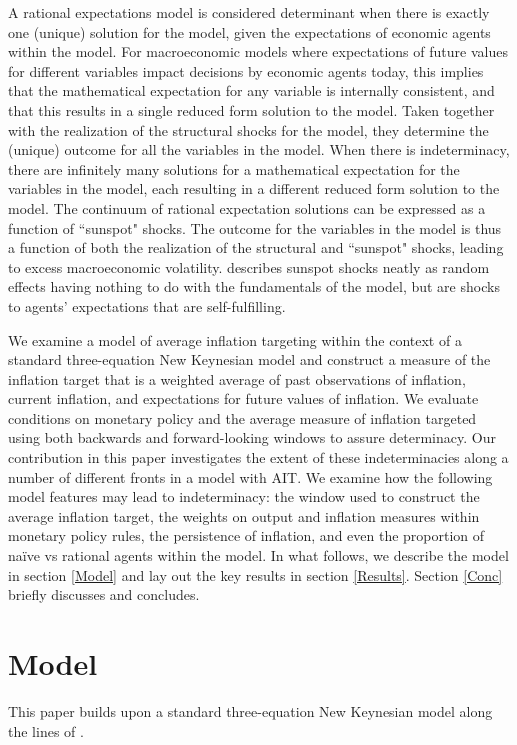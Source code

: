 \documentclass[english,authoryear,12pt]{elsarticle}
\begin{document}
A rational expectations model is considered determinant when there is exactly one (unique) solution for the model, given the expectations of economic agents within the model. For macroeconomic models where expectations of future values for different variables impact decisions by economic agents today, this implies that the mathematical expectation for any variable is internally consistent, and that this results in a single reduced form solution to the model. Taken together with the realization of the structural shocks for the model, they determine the (unique) outcome for all the variables in the model. When there is indeterminacy, there are infinitely many solutions for a mathematical expectation for the variables in the model, each resulting in a different reduced form solution to the model. The continuum of rational expectation solutions can be expressed as a function of ``sunspot" shocks. The outcome for the variables in the model is thus a function of both the realization of the structural and ``sunspot" shocks, leading to excess macroeconomic volatility. \cite{woodford1987} describes sunspot shocks neatly as random effects having nothing to do with the fundamentals of the model, but are shocks to agents' expectations that are self-fulfilling. 

We examine a model of average inflation targeting within the context of a standard three-equation New Keynesian model and construct a measure of the inflation target that is a weighted average of past observations of inflation, current inflation, and expectations for future values of inflation. We evaluate conditions on monetary policy and the average measure of inflation targeted using both backwards and forward-looking windows to assure determinacy. Our contribution in this paper investigates the extent of these indeterminacies along a number of different fronts in a model with AIT. We examine how the following model features may lead to indeterminacy: the window used to construct the average inflation target, the weights on output and inflation measures within monetary policy rules, the persistence of inflation, and even the proportion of na\"ive vs rational agents within the model. In what follows, we describe the model in section \ref*{Model} and lay out the key results in section \ref*{Results}. Section \ref*{Conc} briefly discusses and concludes.

\section{\label{Model}Model}
This paper builds upon a standard three-equation New Keynesian model along the lines of \cite{clarida1999}.
\end{document}
